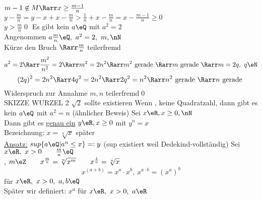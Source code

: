 $m-1\not\in M \Rarr x\geq\frac{m-1}{n}$\\
$y-\frac{m}{n} =y-x+x-\frac{m}{n}>\frac{1}{n}+x-\frac{m}{n}=x-\frac{m-1}{n}\geq0$\\
$y>\frac{m}{n}$\qed
%
\Satz
Es gibt kein $a\eQ$ mit $a^2=2$\\
\bew
Angenommen $a\frac{m}{n}\eQ,\ a^2=2,\ m,\nN$\\
Kürze den Bruch $\Rarr \frac{m}{n}$ teilerfremd\\
$$a^2=2\Rarr \frac{m^2}{n^2}=2 \Rarr m^2=2n^2 \Rarr m^2 \text{ gerade } \Rarr m \text{ gerade } \Rarr m=2q,\ q\eN$$
$$(2q)^2=2n^2 \Rarr 4q^2=2n^2 \Rarr 2q^2=n^2 \Rarr  n^2 \text{ gerade } \Rarr n \text{ gerade }$$
Widerspruch zur Annahme $m,n$ teilerfremd\qed\\
SKIZZE WURZEL 2 \Rarr $\sqrt{2}$ sollte existieren %
\bem
Wenn \nN, keine Quadratzahl, dann gibt es kein $a\eQ$ mit $a^2=n$ (ähnlicher Beweis)
%
\Satz
Sei $x\eR, x\geq 0, \nN$\\
Dann gibt es \underline{genau ein} $y\eR, x\geq 0$ mit $y^n=x$\\
Bezeichnung: $x=\sqrt[n]{x}$
\bew
später\\
\underline{Ansatz:} $sup\{a\eQ|a^n\leq x\}=:y$ (sup existiert weil \R{} Dedekind-vollständig)
%
\Def
Sei $x\eR,\ x>0\qquad \frac{m}{n}\eQ$\\
\nN, $m\eZ\qquad x^{\frac{m}{n}}=\sqrt[n]{x^m}\qquad x^{\frac{1}{n}}=\sqrt[n]{x}$\\
 $$x^{(a+b)}=x^a·x^b,\ x^{a·b}=(x^a)^b$$\hfill für $x\eR,\ x>0,\ a,b\eQ$\\
\bem
Später wir definiert: $x^a$ für $x\eR,\ x>0,\ a\eR$
%
